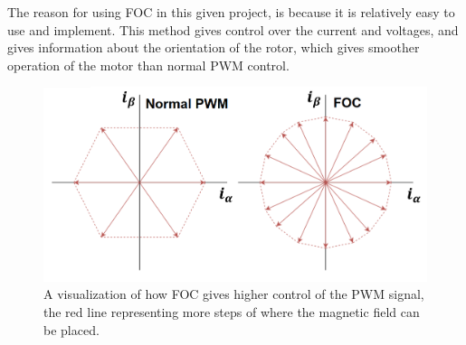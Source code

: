The reason for using FOC in this given project, is because it is relatively easy to use and implement. This method gives control over the current and voltages, and gives information about the orientation of the rotor, which gives smoother operation of the motor than normal PWM control. \\

\begin{figure} [H]
    \centering
    \includegraphics[scale=0.85]{pictures/control/Udklip2.PNG}
    \caption{A visualization of how FOC gives higher control of the PWM signal, the red line representing more steps of where the magnetic field can be placed.}
    \label{fig:my_label}
\end{figure}

